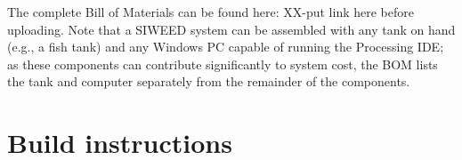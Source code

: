 \documentclass[11pt, letterpaper]{article}
\begin{document}

The complete Bill of Materials can be found here: XX-put link here before uploading. Note that a SIWEED system can be assembled with any tank on hand (e.g., a fish tank) and any Windows PC capable of running the Processing IDE; as these components can contribute significantly to system cost, the BOM lists the tank and computer separately from the remainder of the components.
%

\section{Build instructions}
\end{document}
